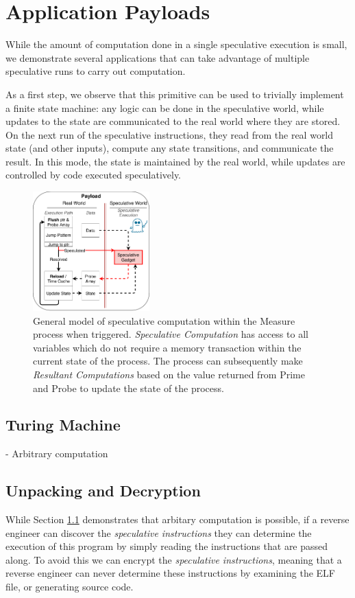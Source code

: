 
\section{Application Payloads}

While the amount of computation done in a single speculative execution is small,
we demonstrate several applications that can take advantage of multiple
speculative runs to carry out computation.

As a first step, we observe that this primitive can be used to trivially
implement a finite state machine: any logic can be done in the speculative
world, while
updates to the state are communicated to the real world where they are stored.
On the next run of the speculative instructions, they read from the real world
state (and other inputs), compute any state transitions, and communicate the
result. In this mode, the state is maintained by the real world, while updates
are controlled by code executed speculatively.

\begin{figure}[t]
    \centering
        \includegraphics[width=0.4\textwidth]{figures/general_model}
    \caption{ General model of speculative computation within the Measure 
        process when triggered. \textit{Speculative Computation} has access
        to all variables which do not require a memory transaction within
        the current state of the process. The process can subsequently make
        \textit{Resultant Computations} based on the value returned from 
        Prime and Probe to update the state of the process. }
    \label{fig:general_model}
\end{figure}


\subsection{Turing Machine}
\label{subsec:turing}
- Arbitrary computation

\subsection{Unpacking and Decryption}
\label{subsec:decryption}
While Section \ref{subsec:turing} demonstrates that arbitary computation is
possible, if a reverse engineer can discover the \emph{speculative instructions}
they can determine the execution of this program by simply reading the
instructions that are passed along. To avoid this we can encrypt the
\emph{speculative instructions}, meaning that a reverse engineer can never
determine these instructions by examining the ELF file, or generating source
code. 

